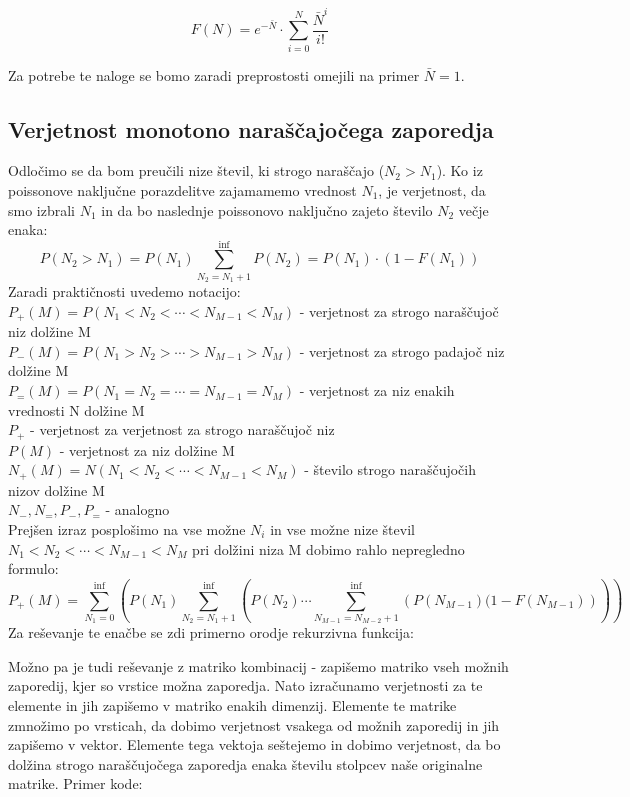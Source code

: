 \documentclass{article}[12pt]
\begin{document}
\[ 
F(N) = e^{-\bar{N}} \cdot \sum_{i=0}^{N} \frac{\bar{N}^i}{i!}
\]

Za potrebe te naloge se bomo zaradi preprostosti omejili na primer $\bar{N}=1$.

\subsection{Verjetnost monotono naraščajočega zaporedja}

Odločimo se da bom preučili nize števil, ki strogo naraščajo ($N_2 > N_1$).
Ko iz poissonove naključne porazdelitve zajamamemo vrednost $N_1$, je verjetnost, da smo izbrali $N_1$ in da bo naslednje poissonovo naključno zajeto število $N_2$ večje enaka:
\[
P(N_2 > N_1) = P(N_1) \sum_{N_2=N_1+1}^{\inf} P(N_2) = P(N_1) \cdot (1 - F(N_1))
\]
Zaradi praktičnosti uvedemo notacijo:\\
$P_+(M) = P(N_1 < N_2 < \cdots < N_{M-1} < N_M)$ - verjetnost za strogo naraščujoč niz dolžine M\\
$P_-(M) = P(N_1 > N_2 > \cdots > N_{M-1} > N_M)$ - verjetnost za strogo padajoč niz dolžine M\\
$P_=(M) = P(N_1 = N_2 = \cdots = N_{M-1} = N_M)$ - verjetnost za niz enakih vrednosti N dolžine M\\
$P_+$ - verjetnost za verjetnost za strogo naraščujoč niz\\
$P(M)$ - verjetnost za niz dolžine M\\
$N_+(M) = N(N_1 < N_2 < \cdots < N_{M-1} < N_M)$ - število strogo naraščujočih nizov dolžine M\\
$N_-, N_=, P_-,P_=$ - analogno\\

Prejšen izraz posplošimo na vse možne $N_i$ in vse možne nize števil $N_1<N_2<\cdots<N_{M-1}<N_M$ pri dolžini niza M dobimo rahlo nepregledno formulo:
\[
P_+(M) = \sum_{N_1=0}^{\inf} \left( P(N_1) \sum_{N_2=N_1+1}^{\inf} \left( P(N_2) \cdots \sum_{N_{M-1}=N_{M-2}+1}^{\inf} \left( P(N_{M-1})(1 - F(N_{M-1}) \right)\right)\right)
\] 
Za reševanje te enačbe se zdi primerno orodje rekurzivna funkcija:


Možno pa je tudi reševanje z matriko kombinacij - zapišemo matriko vseh možnih zaporedij, kjer so vrstice možna zaporedja. Nato izračunamo verjetnosti za te elemente in jih zapišemo v matriko enakih dimenzij. Elemente te matrike zmnožimo po vrsticah, da dobimo verjetnost vsakega od možnih zaporedij in jih zapišemo v vektor. Elemente tega vektoja seštejemo in dobimo verjetnost, da bo dolžina strogo naraščujočega zaporedja enaka številu stolpcev naše originalne matrike. Primer kode:
\end{document}
